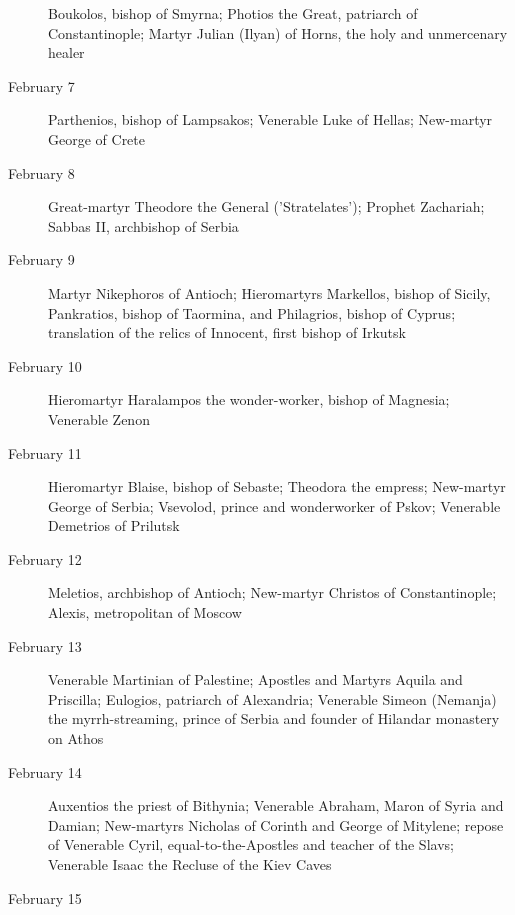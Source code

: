 \begin{description}
Boukolos, bishop of Smyrna; Photios the Great, patriarch of Constantinople; Martyr Julian (Ilyan) of Horns, the holy and unmercenary healer

\item[February 7]

Parthenios, bishop of Lampsakos; Venerable Luke of Hellas; New-martyr George of Crete

\item[February 8]

Great-martyr Theodore the General ('Stratelates'); Prophet Zachariah; Sabbas II, archbishop of Serbia

\item[February 9]

Martyr Nikephoros of Antioch; Hieromartyrs Markellos, bishop of Sicily, Pankratios, bishop of Taormina, and Philagrios, bishop of Cyprus; translation of the relics of Innocent, first bishop of Irkutsk

\item[February 10]

Hieromartyr Haralampos the wonder-worker, bishop of Magnesia; Venerable Zenon

\item[February 11]

Hieromartyr Blaise, bishop of Sebaste; Theodora the empress; New-martyr George of Serbia; Vsevolod, prince and wonderworker of Pskov; Venerable Demetrios of Prilutsk

\item[February 12]

Meletios, archbishop of Antioch; New-martyr Christos of Constantinople; Alexis, metropolitan of Moscow

\item[February 13]

Venerable Martinian of Palestine; Apostles and Martyrs Aquila and Priscilla; Eulogios, patriarch of Alexandria; Venerable Simeon (Nemanja) the myrrh-streaming, prince of Serbia and founder of Hilandar monastery on Athos

\item[February 14]

Auxentios the priest of Bithynia; Venerable Abraham, Maron of Syria and Damian; New-martyrs Nicholas of Corinth and George of Mitylene; repose of Venerable Cyril, equal-to-the-Apostles and teacher of the Slavs; Venerable Isaac the Recluse of the Kiev Caves

\item[February 15]


\end{description}
